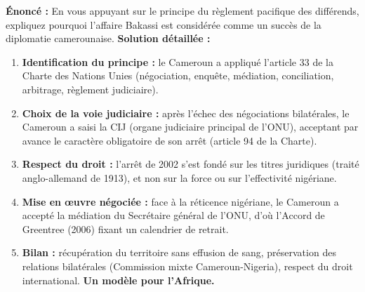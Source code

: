 \documentclass[11pt]{article}
\begin{document}
\begin{exoresolu}
\textbf{Énoncé :} En vous appuyant sur le principe du règlement pacifique des différends, expliquez pourquoi l'affaire Bakassi est considérée comme un succès de la diplomatie camerounaise.
\tcblower
\textbf{Solution détaillée :}
\begin{enumerate}
    \item \textbf{Identification du principe :} le Cameroun a appliqué l'article 33 de la Charte des Nations Unies (négociation, enquête, médiation, conciliation, arbitrage, règlement judiciaire).
    \item \textbf{Choix de la voie judiciaire :} après l'échec des négociations bilatérales, le Cameroun a saisi la CIJ (organe judiciaire principal de l'ONU), acceptant par avance le caractère obligatoire de son arrêt (article 94 de la Charte).
    \item \textbf{Respect du droit :} l'arrêt de 2002 s'est fondé sur les titres juridiques (traité anglo-allemand de 1913), et non sur la force ou sur l'effectivité nigériane.
    \item \textbf{Mise en œuvre négociée :} face à la réticence nigériane, le Cameroun a accepté la médiation du Secrétaire général de l'ONU, d'où l'Accord de Greentree (2006) fixant un calendrier de retrait.
    \item \textbf{Bilan :} récupération du territoire sans effusion de sang, préservation des relations bilatérales (Commission mixte Cameroun-Nigeria), respect du droit international. \textbf{Un modèle pour l'Afrique.}
\end{enumerate}
\end{exoresolu}
\end{document}
